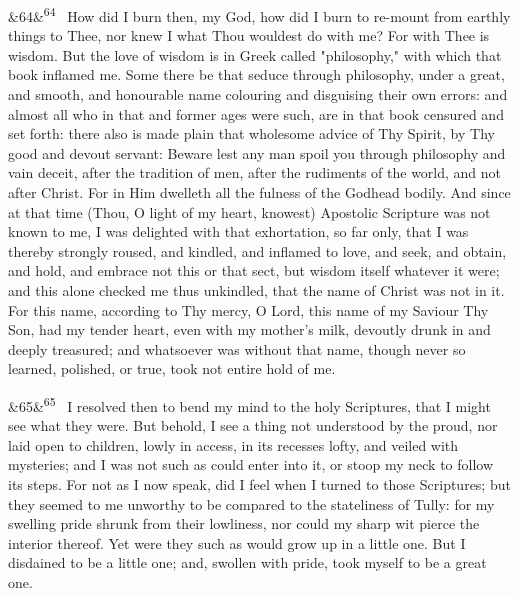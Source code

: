 \documentclass[12pt]{article}
\newcommand{\para}[1][]{\par\noindent\ifx&#1&\else\textsuperscript{\footnotesize #1}~\fi}
\begin{document}
\para[64] How did I burn then, my God, how did I burn to re-mount from earthly things to Thee, nor knew I what Thou wouldest do with me? For with Thee is wisdom. But the love of wisdom is in Greek called "philosophy," with which that book inflamed me. Some there be that seduce through philosophy, under a great, and smooth, and honourable name colouring and disguising their own errors: and almost all who in that and former ages were such, are in that book censured and set forth: there also is made plain that wholesome advice of Thy Spirit, by Thy good and devout servant: Beware lest any man spoil you through philosophy and vain deceit, after the tradition of men, after the rudiments of the world, and not after Christ. For in Him dwelleth all the fulness of the Godhead bodily. And since at that time (Thou, O light of my heart, knowest) Apostolic Scripture was not known to me, I was delighted with that exhortation, so far only, that I was thereby strongly roused, and kindled, and inflamed to love, and seek, and obtain, and hold, and embrace not this or that sect, but wisdom itself whatever it were; and this alone checked me thus unkindled, that the name of Christ was not in it. For this name, according to Thy mercy, O Lord, this name of my Saviour Thy Son, had my tender heart, even with my mother's milk, devoutly drunk in and deeply treasured; and whatsoever was without that name, though never so learned, polished, or true, took not entire hold of me.

\para[65] I resolved then to bend my mind to the holy Scriptures, that I might see what they were. But behold, I see a thing not understood by the proud, nor laid open to children, lowly in access, in its recesses lofty, and veiled with mysteries; and I was not such as could enter into it, or stoop my neck to follow its steps. For not as I now speak, did I feel when I turned to those Scriptures; but they seemed to me unworthy to be compared to the stateliness of Tully: for my swelling pride shrunk from their lowliness, nor could my sharp wit pierce the interior thereof. Yet were they such as would grow up in a little one. But I disdained to be a little one; and, swollen with pride, took myself to be a great one.
\end{document}
